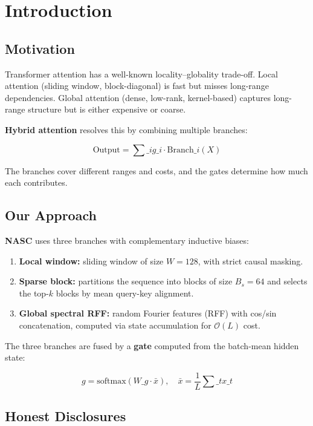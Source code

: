 
\section{Introduction}

\subsection{Motivation}

Transformer attention has a well-known locality--globality trade-off. 
Local attention (sliding window, block-diagonal) is fast but misses 
long-range dependencies. Global attention (dense, low-rank, kernel-based) 
captures long-range structure but is either expensive or coarse.

\textbf{Hybrid attention} resolves this by combining multiple branches:

\[
\text{Output} = \sum\_{i} g\_i \cdot \text{Branch}\_i(X)
\tag{1.1}
\]

The branches cover different ranges and costs, and the gates determine 
how much each contributes.

\subsection{Our Approach}

\textbf{NASC} uses three branches with complementary inductive biases:

\begin{enumerate}
\item \textbf{Local window:} sliding window of size $W = 128$, with
  strict causal masking.
\item \textbf{Sparse block:} partitions the sequence into blocks of size
  $B_s = 64$ and selects the top-$k$ blocks by mean
  query-key alignment.
\item \textbf{Global spectral RFF:} random Fourier features (RFF) with cos/sin
  concatenation, computed via state accumulation for $\mathcal{O}(L)$
  cost.

\end{enumerate}
The three branches are fused by a \textbf{gate} computed from the batch-mean 
hidden state:

\[
g = \text{softmax}(W\_g \cdot \bar{x}), \quad \bar{x} = \frac{1}{L} \sum\_t x\_t
\tag{1.2}
\]

\subsection{Honest Disclosures}

